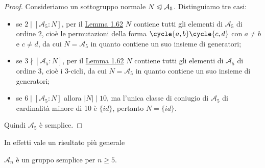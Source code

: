 \documentclass[11pt]{scrartcl}
\begin{document}
\begin{proof}
    Consideriamo un sottogruppo normale $N\trianglelefteqslant \mathcal{A}_5$.
    Distinguiamo tre casi:
    \begin{itemize}
        \item se $2 \mid [\mathcal{A}_5:N]$, per il \hyperref[lemma6.0]{Lemma 1.62}
        $N$ contiene tutti gli elementi di 
        $\mathcal{A}_5$ di ordine $2$, cioè le permutazioni della forma $\cycle{a, b}\cycle{c, d}$
        con $a\neq b$ e $c \neq d$, da cui $N = \mathcal{A}_5$ in quanto contiene 
        un suo insieme di generatori;
        \item se $3\nmid [\mathcal{A}_5:N]$, per il \hyperref[lemma6.0]{Lemma 1.62}
        $N$ contiene tutti gli elementi di 
        $\mathcal{A}_5$ di ordine 3, cioè i 3-cicli, da cui $N = \mathcal{A}_5$
        in quanto contiene un suo insieme di generatori;
        \item se $6 \mid [\mathcal{A}_5:N]$ allora $|N| \mid 10$, ma l'unica
        classe di coniugio di $\mathcal{A}_5$ di cardinalità minore di 10 è
        $\{id\}$, pertanto $N = \{id\}$.
    \end{itemize}
    Quindi $\mathcal{A}_5$ è semplice.
\end{proof}

In effetti vale un risultato più generale

\begin{proposition}
    $\mathcal{A}_n$ è un gruppo semplice per $n \geq 5$.
\end{proposition}
\end{document}
